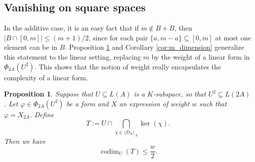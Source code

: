 \documentclass[12pt]{amsart}
\renewcommand{\leq}{\leqslant}
\newtheorem{proposition}[theorem]{Proposition}
\theoremstyle{definition}
\newcommand{\divi}[1]{\langle #1 \rangle}
\begin{document}
	\subsection{Vanishing on square spaces}
	In the additive case, it is an easy fact that if $m \not\in B+B$, then $|B \cap [0, m]| \leq (m+1)/2$, since for each pair $\{a, m-a\} \subseteq [0, m]$ at most one element can be in $B$. Proposition \ref{prop:m_dimension} and Corollary \ref{cor:m_dimension} generalize this statement to the linear setting, replacing $m$ by the weight of a linear form in $\Phi_{2A}(U^2)$. 
	This shows that the notion of weight really encapsulates the complexity of a linear form.
	
	\begin{proposition}\label{prop:m_dimension}
		Suppose that $U \subseteq L(A)$ is a $K$-subspace, so that
		$U^2 \subseteq L(2A)$.
		Let $\varphi \in \Phi_{2A }(U^2)$ be a form and $X$ an expression of weight $w$ such that $\varphi= X_{2A}$.
		Define
		$$T:=U\cap\bigcap_{\chi\in \divi{D_X} _A}\ker(\chi).$$
		Then we have
		$$\operatorname{codim}_U(T) \le \frac{w}{2}.$$
	\end{proposition}
\end{document}
